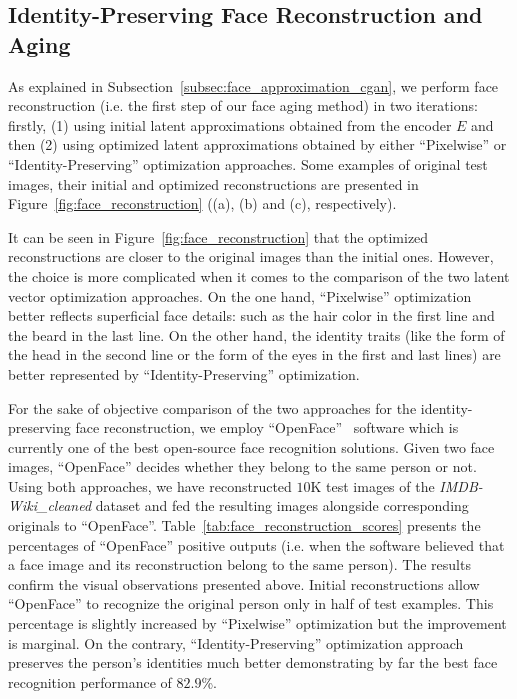 \documentclass{article}
\begin{document}
\subsection{Identity-Preserving Face Reconstruction and Aging}
\label{subsec:identity_preserving_face_reconstruction_aging}

As explained in Subsection~\ref{subsec:face_approximation_cgan}, we perform face reconstruction (i.e. the first step of our face aging method) in two iterations: firstly, (1) using initial latent approximations obtained from the encoder $E$ and then (2) using optimized latent approximations obtained by either ``Pixelwise'' or ``Identity-Preserving'' optimization approaches.
Some examples of original test images, their initial and optimized reconstructions are presented in Figure~\ref{fig:face_reconstruction} ((a), (b) and (c), respectively).

It can be seen in Figure~\ref{fig:face_reconstruction} that the optimized reconstructions are closer to the original images than the initial ones.
However, the choice is more complicated when it comes to the comparison of the two latent vector optimization approaches.
On the one hand, ``Pixelwise'' optimization better reflects superficial face details: such as the hair color in the first line and the beard in the last line.
On the other hand, the identity traits (like the form of the head in the second line or the form of the eyes in the first and last lines) are better represented by ``Identity-Preserving'' optimization.

For the sake of objective comparison of the two approaches for the identity-preserving face reconstruction, we employ ``OpenFace''~\cite{amos2016openface} software which is currently one of the best open-source face recognition solutions.
Given two face images, ``OpenFace'' decides whether they belong to the same person or not.
Using both approaches, we have reconstructed $10$K test images of the \textit{IMDB-Wiki\_cleaned} dataset and fed the resulting images alongside corresponding originals to ``OpenFace''.
Table~\ref{tab:face_reconstruction_scores} presents the percentages of ``OpenFace'' positive outputs (i.e. when the software believed that a face image and its reconstruction belong to the same person).
The results confirm the visual observations presented above.
Initial reconstructions allow ``OpenFace'' to recognize the original person only in half of test examples.
This percentage is slightly increased by ``Pixelwise'' optimization but the improvement is marginal.
On the contrary, ``Identity-Preserving'' optimization approach preserves the person's identities much better demonstrating by far the best face recognition performance of $82.9$\%.
\end{document}
